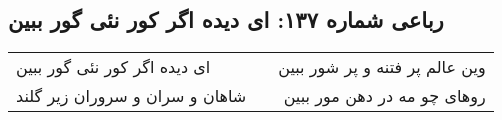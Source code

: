 \begin{center}
\section*{رباعی شماره ۱۳۷: ای دیده اگر کور نئی گور ببین}
\label{sec:sh137}
\begin{longtable}{l p{0.5cm} r}
ای دیده اگر کور نئی گور ببین
&&
وین عالم پر فتنه و پر شور ببین
\\
شاهان و سران و سروران زیر گلند
&&
روهای چو مه در دهن مور ببین
\\
\end{longtable}
\end{center}
